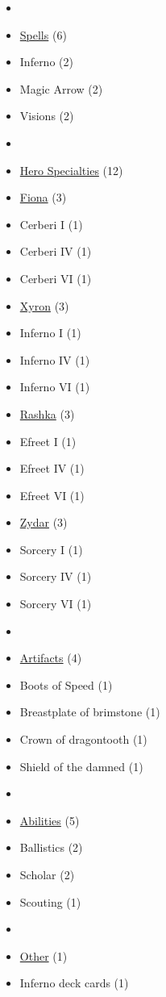 \documentclass[12pt]{article}
\begin{document}
\begin{multicols}{3}
\begin{itemize}[leftmargin=0pt, label={}, noitemsep, noitemsep]
  \item
  \item \underline{Spells} (6)
  \item Inferno (2)
  \item Magic Arrow (2)
  \item Visions (2)
  \item
  \item \underline{Hero Specialties} (12)
  \item \underline{Fiona} (3)
  \item Cerberi I (1)
  \item Cerberi IV (1)
  \item Cerberi VI (1)
  \item \underline{Xyron} (3)
  \item Inferno I (1)
  \item Inferno IV (1)
  \item Inferno VI (1)
  \item \underline{Rashka} (3)
  \item Efreet I (1)
  \item Efreet IV (1)
  \item Efreet VI (1)
  \item \underline{Zydar} (3)
  \item Sorcery I (1)
  \item Sorcery IV (1)
  \item Sorcery VI (1)
  \item
  \item \underline{Artifacts} (4)
  \item Boots of Speed (1)
  \item Breastplate of brimstone (1)
  \item Crown of dragontooth (1)
  \item Shield of the damned (1)
  \item
  \item \underline{Abilities} (5)
  \item Ballistics (2)
  \item Scholar (2)
  \item Scouting (1)
  \item
  \item \underline{Other} (1)
  \item Inferno deck cards (1)
\end{itemize}

\end{multicols}
\end{document}
